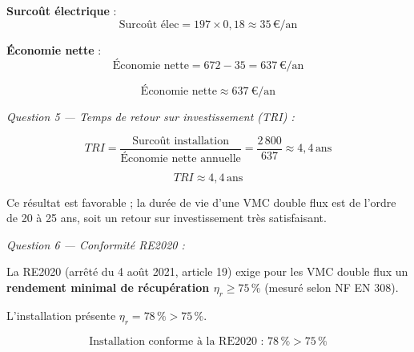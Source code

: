 \textbf{Surcoût électrique} :
\[
  \text{Surcoût élec} = 197 \times 0{,}18 \approx 35\,\text{€/an}
\]

\textbf{Économie nette} :
\[
  \text{Économie nette} = 672 - 35 = 637\,\text{€/an}
\]

\[
  \boxed{\text{Économie nette} \approx \SI{637}{\text{€}/\text{an}}}
\]

\textit{Question 5 — Temps de retour sur investissement (TRI) :}

\[
  TRI = \frac{\text{Surcoût installation}}{\text{Économie nette annuelle}} = \frac{2\,800}{637} \approx 4{,}4\,\text{ans}
\]

\[
  \boxed{TRI \approx 4{,}4\,\text{ans}}
\]

Ce résultat est favorable ; la durée de vie d'une VMC double flux est de l'ordre de 20 à 25 ans, soit un retour sur investissement très satisfaisant.

\textit{Question 6 — Conformité RE2020 :}

La RE2020 (arrêté du 4 août 2021, article 19) exige pour les VMC double flux un \textbf{rendement minimal de récupération $\eta_r \geq 75\,\%$} (mesuré selon NF EN 308).

L'installation présente $\eta_r = 78\,\% > 75\,\%$.

\[
  \boxed{\text{Installation conforme à la RE2020 : } 78\,\% > 75\,\%}
\]
